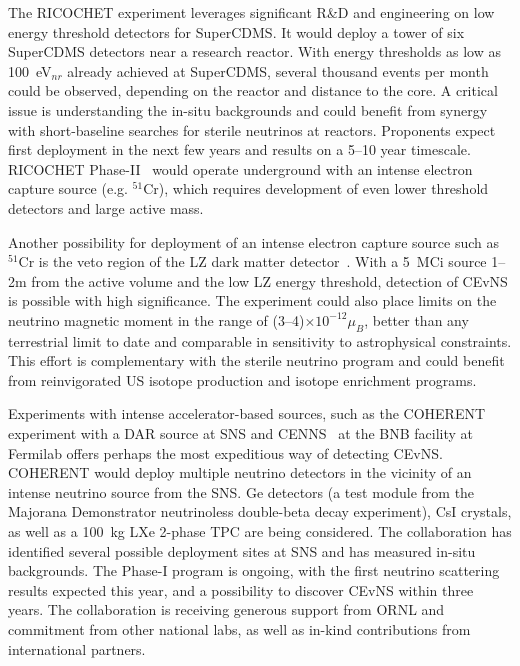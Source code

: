 The RICOCHET experiment leverages significant R\&D and engineering on
low energy threshold detectors for SuperCDMS. It would deploy a tower
of six SuperCDMS detectors near a research reactor. With energy
thresholds as low as 100~eV$_{nr}$ already achieved at SuperCDMS,
several thousand events per month could be observed, depending on the
reactor and distance to the core. A critical issue is understanding
the in-situ backgrounds and could benefit from synergy with
short-baseline searches for sterile neutrinos at reactors.  Proponents
expect first deployment in the next few years and results on a 5--10
year timescale.  RICOCHET Phase-II~\cite{Formaggio:2011jt} would
operate underground with an intense electron capture source
(e.g. $^{51}$Cr), which requires development of even lower threshold
detectors and large active mass.

Another possibility for deployment of an intense electron capture
source such as $^{51}$Cr is the veto region of the LZ dark matter
detector~\cite{Coloma:2014hka}. With a 5~MCi source 1--2m from the
active volume and the low LZ energy threshold, detection
of CEvNS is possible with high significance. The experiment could
also place limits on the neutrino magnetic moment in the range
of (3--4)$\times10^{-12}\mu_B$, better than any terrestrial limit to
date and comparable in sensitivity to astrophysical constraints. This
effort is complementary with the sterile neutrino program and
could benefit from reinvigorated US isotope production and
isotope enrichment programs.


Experiments with intense accelerator-based sources, such as the
COHERENT~\cite{Akimov:2013yow} experiment with a DAR source at SNS and
CENNS~\cite{Brice:2013fwa} at the BNB facility at Fermilab offers
perhaps the most expeditious way of detecting CEvNS. COHERENT
would deploy multiple neutrino detectors in the vicinity of an intense
neutrino source from the SNS. Ge detectors (a test module from
the {\sc Majorana Demonstrator\/} neutrinoless double-beta decay
experiment), CsI crystals, as well as a 100~kg LXe 2-phase TPC are
being considered. The collaboration has identified several possible
deployment sites at SNS and has measured in-situ backgrounds.  The
Phase-I program is  ongoing, with the first neutrino scattering
results expected this year, and a possibility to discover CEvNS
within three years. The collaboration is receiving generous support
from ORNL and commitment from other national labs, as well as in-kind
contributions from international partners. 


